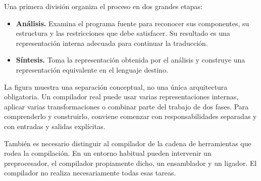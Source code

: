 \documentclass[11pt,spanish]{article}
\begin{document}
Una primera división organiza el proceso en dos grandes etapas:

\begin{itemize}
    \item \textbf{Análisis.} Examina el programa fuente para reconocer sus componentes, su estructura y las restricciones que debe satisfacer. Su resultado es una representación interna adecuada para continuar la traducción.
    \item \textbf{Síntesis.} Toma la representación obtenida por el análisis y construye una representación equivalente en el lenguaje destino.
\end{itemize}

\begin{center}
\end{center}

La figura muestra una separación conceptual, no una única arquitectura obligatoria. Un compilador real puede usar varias representaciones internas, aplicar varias transformaciones o combinar parte del trabajo de dos fases. Para comprenderlo y construirlo, conviene comenzar con responsabilidades separadas y con entradas y salidas explícitas.

También es necesario distinguir al compilador de la cadena de herramientas que rodea la compilación. En un entorno habitual pueden intervenir un preprocesador, el compilador propiamente dicho, un ensamblador y un ligador. El compilador no realiza necesariamente todas esas tareas.
\end{document}
